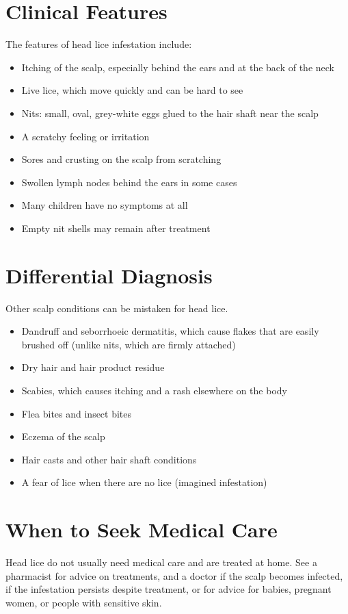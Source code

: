 \section*{Clinical Features}
The features of head lice infestation include:

\begin{itemize}
    \item Itching of the scalp, especially behind the ears and at the back of the neck
    \item Live lice, which move quickly and can be hard to see
    \item Nits: small, oval, grey-white eggs glued to the hair shaft near the scalp
    \item A scratchy feeling or irritation
    \item Sores and crusting on the scalp from scratching
    \item Swollen lymph nodes behind the ears in some cases
    \item Many children have no symptoms at all
    \item Empty nit shells may remain after treatment
\end{itemize}

\section*{Differential Diagnosis}
Other scalp conditions can be mistaken for head lice.

\begin{itemize}
    \item Dandruff and seborrhoeic dermatitis, which cause flakes that are easily brushed off (unlike nits, which are firmly attached)
    \item Dry hair and hair product residue
    \item Scabies, which causes itching and a rash elsewhere on the body
    \item Flea bites and insect bites
    \item Eczema of the scalp
    \item Hair casts and other hair shaft conditions
    \item A fear of lice when there are no lice (imagined infestation)
\end{itemize}

\section*{When to Seek Medical Care}
Head lice do not usually need medical care and are treated at home. See a pharmacist for advice on treatments, and a doctor if the scalp becomes infected, if the infestation persists despite treatment, or for advice for babies, pregnant women, or people with sensitive skin.

